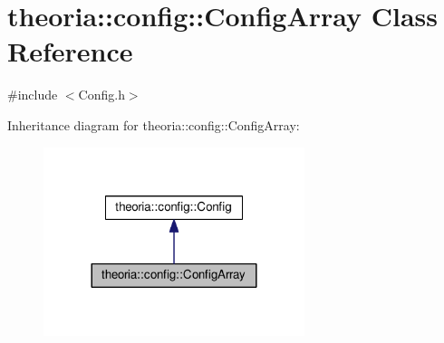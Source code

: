 \hypertarget{classtheoria_1_1config_1_1ConfigArray}{}\section{theoria\+:\+:config\+:\+:Config\+Array Class Reference}
\label{classtheoria_1_1config_1_1ConfigArray}


{\ttfamily \#include $<$Config.\+h$>$}



Inheritance diagram for theoria\+:\+:config\+:\+:Config\+Array\+:\nopagebreak
\begin{figure}[H]
\begin{center}
\leavevmode
\includegraphics[width=216pt]{classtheoria_1_1config_1_1ConfigArray__inherit__graph}
\end{center}
\end{figure}


